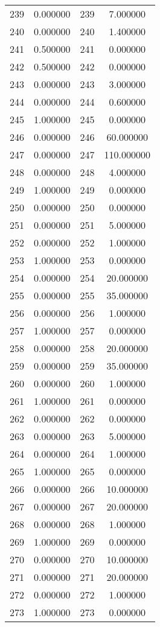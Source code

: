 \documentclass[12pt]{article}
\begin{document}
\begin{longtable}{@{}cccc@{}}
239 & 0.000000 & 239 & 7.000000 \\
240 & 0.000000 & 240 & 1.400000 \\
241 & 0.500000 & 241 & 0.000000 \\
242 & 0.500000 & 242 & 0.000000 \\
243 & 0.000000 & 243 & 3.000000 \\
244 & 0.000000 & 244 & 0.600000 \\
245 & 1.000000 & 245 & 0.000000 \\
246 & 0.000000 & 246 & 60.000000 \\
247 & 0.000000 & 247 & 110.000000 \\
248 & 0.000000 & 248 & 4.000000 \\
249 & 1.000000 & 249 & 0.000000 \\
250 & 0.000000 & 250 & 0.000000 \\
251 & 0.000000 & 251 & 5.000000 \\
252 & 0.000000 & 252 & 1.000000 \\
253 & 1.000000 & 253 & 0.000000 \\
254 & 0.000000 & 254 & 20.000000 \\
255 & 0.000000 & 255 & 35.000000 \\
256 & 0.000000 & 256 & 1.000000 \\
257 & 1.000000 & 257 & 0.000000 \\
258 & 0.000000 & 258 & 20.000000 \\
259 & 0.000000 & 259 & 35.000000 \\
260 & 0.000000 & 260 & 1.000000 \\
261 & 1.000000 & 261 & 0.000000 \\
262 & 0.000000 & 262 & 0.000000 \\
263 & 0.000000 & 263 & 5.000000 \\
264 & 0.000000 & 264 & 1.000000 \\
265 & 1.000000 & 265 & 0.000000 \\
266 & 0.000000 & 266 & 10.000000 \\
267 & 0.000000 & 267 & 20.000000 \\
268 & 0.000000 & 268 & 1.000000 \\
269 & 1.000000 & 269 & 0.000000 \\
270 & 0.000000 & 270 & 10.000000 \\
271 & 0.000000 & 271 & 20.000000 \\
272 & 0.000000 & 272 & 1.000000 \\
273 & 1.000000 & 273 & 0.000000 \\

\end{longtable}
\end{document}
